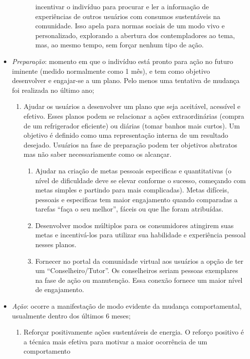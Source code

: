 \begin{itemize}
\begin{enumerate}
\begin{enumerate}
incentivar o indivíduo para procurar e ler a informação de experiências de
outros usuários com consumos sustentáveis na comunidade. Isso apela para normas
sociais de um modo vivo e personalizado, explorando a abertura dos
contempladores ao tema, mas, ao mesmo tempo, sem forçar nenhum tipo de ação.
\end{enumerate}
\end{enumerate}
\item \emph{Preparação}: momento em que o indivíduo está pronto para ação no
futuro iminente (medido normalmente como 1 mês), e tem como objetivo desenvolver
e engajar-se a um plano. Pelo menos uma tentativa de mudança foi realizada no
último ano;
\begin{enumerate}
\item Ajudar os usuários a desenvolver um plano que seja aceitável, acessível e
efetivo. Esses planos podem se relacionar a ações extraordinárias (compra de um
refrigerador eficiente) ou diárias (tomar banhos mais curtos). Um objetivo é
definido como uma representação interna de um resultado desejado. Usuários na
fase de preparação podem ter objetivos abstratos mas não saber necessariamente
como os alcançar.
\begin{enumerate}
\item Ajudar na criação de metas pessoais especificas e quantitativas
(o nível de dificuldade deve se elevar conforme o sucesso, começando com metas
simples e partindo para mais complicadas). Metas difíceis, pessoais e
especificas tem maior engajamento quando comparadas a tarefas ``faça o seu
melhor'', fáceis ou que lhe foram atribuídas.
\item Desenvolver modos múltiplos para os consumidores atingirem suas metas e
incentivá-los para utilizar sua habilidade e experiência pessoal nesses planos.
\item Fornecer no portal da comunidade virtual aos usuários a opção de ter
um ``Conselheiro/Tutor''. Os conselheiros seriam pessoas exemplares na
fase de ação ou manutenção. Essa conexão fornece um maior nível de
engajamento.
\end{enumerate}
\end{enumerate}
\item \emph{Ação}: ocorre a manifestação de modo evidente da mudança
comportamental, usualmente dentro dos últimos 6 meses;
\begin{enumerate}
\item Reforçar positivamente ações sustentáveis de energia. O reforço positivo é
a técnica mais efetiva para motivar a maior ocorrência de um comportamento

\end{enumerate}
\end{itemize}
